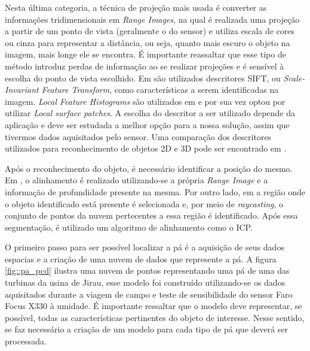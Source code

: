 Nesta última categoria, a técnica de projeção
mais usada é converter as informações tridimensionais em \textit{Range Images},
na qual é realizada uma projeção a partir de um ponto de vista (geralmente o do sensor) e utiliza escala
de cores ou cinza para representar a distância, ou seja, quanto mais escuro o
objeto na imagem, mais longe ele se encontra. É importante reassaltar que esse
tipo de método introduz perdas de informação ao se realizar projeções e é
sensível à escolha do ponto de vista escolhido. Em \cite{Bayramoglu2010} são
utilizados descritores SIFT, ou \textit{Scale-Invariant Feature Transform},  
como características a serem identificadas na imagem. \textit{Local Feature
Histograms} são utilizados em \cite{Hetzel2001} e por sua vez \cite{Chen2007}
optou por utilizar \textit{Local surface patches}. A escolha do descritor a ser
utilizado depende da aplicação e deve ser estudada a melhor opção para a nossa
solução, assim que tivermos dados aquisitados pelo sensor. Uma comparação dos
descritores utilizados para reconhecimento de objetos 2D e 3D pode ser
encontrado em \cite{Zaharia2004, Weber2014}.

Após o reconhecimento do objeto, é necessário identificar a posição do mesmo. Em
\cite{Steder2009}, o alinhamento é realizado utilizando-se a própria
\textit{Range Image} e a informação de profundidade presente na mesma. Por outro
lado, em \cite{Nuchter2005} a região onde o objeto identificado está presente é
selecionada e, por meio de \textit{raycasting}, o conjunto de pontos da nuvem
pertecentes a essa região é identificado. Após essa segmentação, é utilizado um
algoritmo de alinhamento como o ICP.

O primeiro passo para ser possível localizar a pá é a aquisição de seus dados
espacias e a criação de uma nuvem de dados que represente a pá. A figura
\ref{fig::pa_pcd} ilustra uma nuvem de pontos representando uma pá de uma das
turbinas da usina de Jirau, esse modelo foi construído utilizando-se os dados
aquisitados durante a viagem de campo e teste de sensibilidade do sensor Faro
Focus X330 à umidade. É importante ressaltar que o modelo deve representar, se
possível, todas as características pertinentes do objeto de interesse. Nesse
sentido, se faz necessário a criação de um modelo para cada tipo de pá que
deverá ser processada. 


